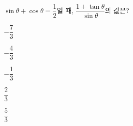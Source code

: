 $\sin\theta+\cos\theta=\dfrac{1}{2}$일 때, $\dfrac{1+\tan\theta}{\sin\theta}$의 값은?
\begin{choices32}{\rule[-3ex]{0pt}{8ex}$-\dfrac{7}{3}$}{\rule[-3ex]{0pt}{8ex}$-\dfrac{4}{3}$}{\rule[-3ex]{0pt}{8ex}$-\dfrac{1}{3}$}{\rule[-3ex]{0pt}{8ex}$\dfrac{2}{3}$}{\rule[-3ex]{0pt}{8ex}$\dfrac{5}{3}$}\end{choices32}
